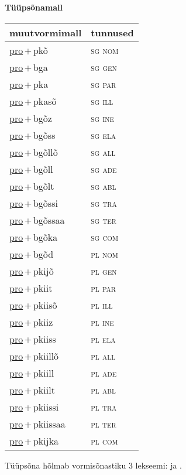 
\vspace{1.8em}
\begin{minipage}{\textwidth}
\textbf{Tüüpsõnamall \,}\\

\begin{sideways}
\begin{tabular}{l l}
muutvormimall & tunnused \\
\hline
\underline{pro}\,+\,pkõ & \textsc{ sg nom } \\
\underline{pro}\,+\,bga & \textsc{ sg gen } \\
\underline{pro}\,+\,pka & \textsc{ sg par } \\
\underline{pro}\,+\,pkasõ & \textsc{ sg ill } \\
\underline{pro}\,+\,bgõz & \textsc{ sg ine } \\
\underline{pro}\,+\,bgõss & \textsc{ sg ela } \\
\underline{pro}\,+\,bgõllõ & \textsc{ sg all } \\
\underline{pro}\,+\,bgõll & \textsc{ sg ade } \\
\underline{pro}\,+\,bgõlt & \textsc{ sg abl } \\
\underline{pro}\,+\,bgõssi & \textsc{ sg tra } \\
\underline{pro}\,+\,bgõssaa & \textsc{ sg ter } \\
\underline{pro}\,+\,bgõka & \textsc{ sg com } \\
\underline{pro}\,+\,bgõd & \textsc{ pl nom } \\
\underline{pro}\,+\,pkijõ & \textsc{ pl gen } \\
\underline{pro}\,+\,pkiit & \textsc{ pl par } \\
\underline{pro}\,+\,pkiisõ & \textsc{ pl ill } \\
\underline{pro}\,+\,pkiiz & \textsc{ pl ine } \\
\underline{pro}\,+\,pkiiss & \textsc{ pl ela } \\
\underline{pro}\,+\,pkiillõ & \textsc{ pl all } \\
\underline{pro}\,+\,pkiill & \textsc{ pl ade } \\
\underline{pro}\,+\,pkiilt & \textsc{ pl abl } \\
\underline{pro}\,+\,pkiissi & \textsc{ pl tra } \\
\underline{pro}\,+\,pkiissaa & \textsc{ pl ter } \\
\underline{pro}\,+\,pkijka & \textsc{ pl com } \\
\end{tabular}
\end{sideways}
\label{tab:tüüpsõnamall-propkõ}

\end{minipage}

 
\vspace{1em}
\noindent Tüüpsõna hõlmab vormisõnastiku 3 lekseemi:  ja .
